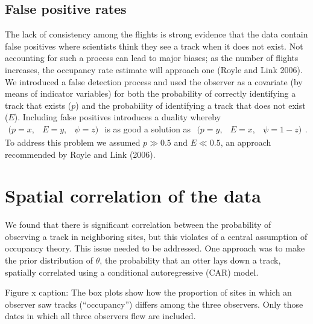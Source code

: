 \documentclass[12pt]{article}
\begin{document}
\subsection{False positive rates}
The lack of consistency among the flights is strong evidence that the data 
contain false positives where scientists think they see a track when it does not 
exist. Not accounting for such a process can lead to major biases; as the number 
of flights increases, the occupancy rate estimate will approach one (Royle and 
Link 2006). We introduced a false detection process and used the observer as a 
covariate (by means of indicator variables) for both the probability of 
correctly identifying a track that exists ($p$) and the probability of 
identifying a track that does not exist ($E$). Including false positives 
introduces a duality whereby $\begin{array}{ccc}(p = x, & E = y, & \psi = z)\end
{array}$ is as good a solution as $\begin{array}{ccc}(p = y, & E = x, & \psi = 
1-z)\end{array}$. To address this problem we assumed $p\gg0.5$ and $E\ll0.5$, an 
approach recommended by Royle and Link (2006).

\section{Spatial correlation of the data}
We found that there is significant correlation between the probability of 
observing a track in neighboring sites, but this violates of a central 
assumption of occupancy theory. This issue needed to be addressed. One approach 
was to make the prior distribution of $\theta$, the probability that an otter 
lays down a track, spatially correlated using a conditional autoregressive
(CAR) model.


Figure x caption:
The box plots show how the proportion of sites in which an observer saw tracks 
(``occupancy'') differs among the three observers. Only those dates in which all 
three observers flew are included.
\end{document}
